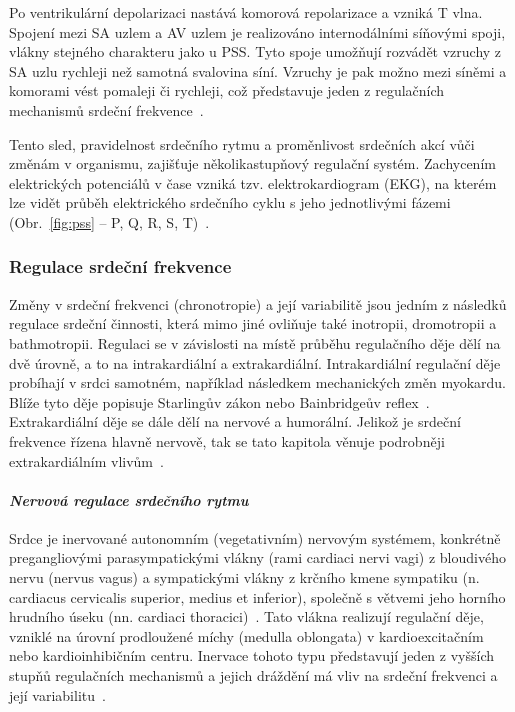 Po ventrikulární depolarizaci nastává komorová repolarizace a vzniká T vlna.
Spojení mezi SA uzlem a AV uzlem je realizováno internodálními síňovými spoji,
vlákny stejného charakteru jako u PSS. Tyto spoje umožňují rozvádět vzruchy z SA
uzlu rychleji než samotná svalovina síní. Vzruchy je pak možno mezi síněmi a
komorami vést pomaleji či rychleji, což představuje jeden z regulačních
mechanismů srdeční frekvence~\cite{Dylevsky2013,Cihak2016}.

Tento sled, pravidelnost srdečního rytmu a proměnlivost srdečních akcí vůči
změnám v organismu, zajišťuje několikastupňový regulační systém. Zachycením
elektrických potenciálů v čase vzniká tzv. elektrokardiogram (EKG), na
kterém lze vidět průběh elektrického srdečního cyklu s jeho jednotlivými fázemi
(Obr.~\ref{fig:pss} -- P, Q, R, S, T)~\cite{Dylevsky2013,Cihak2016}.


\subsubsection{Regulace srdeční frekvence}
\label{section:hr_regulation}
Změny v srdeční frekvenci (chronotropie) a její variabilitě jsou jedním z
následků regulace srdeční činnosti, která mimo jiné ovliňuje také inotropii,
dromotropii a bathmotropii. Regulaci se v závislosti na místě průběhu
regulačního děje dělí na dvě úrovně, a to na intrakardiální a extrakardiální.
Intrakardiální regulační děje probíhají v srdci samotném, například následkem
mechanických změn myokardu. Blíže tyto děje popisuje Starlingův zákon nebo
Bainbridgeův reflex~\cite{Kittnar2020}. Extrakardiální děje se dále dělí na
nervové a humorální. Jelikož je srdeční frekvence řízena hlavně nervově, tak se
tato kapitola věnuje podrobněji extrakardiálním vlivům~\cite{Orel2019}.

\paragraph*{\textit{Nervová regulace srdečního rytmu}\\} Srdce je inervované
autonomním (vegetativním) nervovým systémem, konkrétně pregangliovými
parasympatickými vlákny (rami cardiaci nervi vagi) z bloudivého nervu (nervus
vagus) a sympatickými vlákny z krčního kmene sympatiku (n. cardiacus cervicalis
superior, medius et inferior), společně s větvemi jeho horního hrudního úseku
(nn. cardiaci thoracici)~\cite{Dylevsky2013,Kittnar2020}. Tato vlákna realizují
regulační děje, vzniklé na úrovní prodloužené míchy (medulla oblongata) v
kardioexcitačním nebo kardioinhibičním centru. Inervace tohoto typu představují
jeden z vyšších stupňů regulačních mechanismů a jejich dráždění má vliv na
srdeční frekvenci a její variabilitu~\cite{Dylevsky2013,Trojan2002}.

